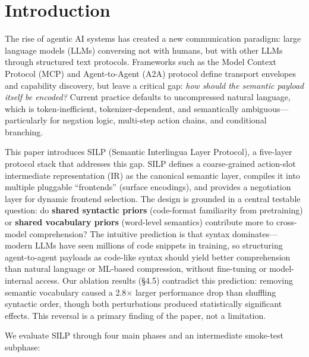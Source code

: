 \documentclass{article}
\begin{document}
\section{Introduction}\label{introduction}



The rise of agentic AI systems has created a new communication paradigm: large language models (LLMs) conversing not with humans, but with other LLMs through structured text protocols. Frameworks such as the Model Context Protocol (MCP) and Agent-to-Agent (A2A) protocol define transport envelopes and capability discovery, but leave a critical gap: \emph{how should the semantic payload itself be encoded?} Current practice defaults to uncompressed natural language, which is token-inefficient, tokenizer-dependent, and semantically ambiguous---particularly for negation logic, multi-step action chains, and conditional branching.



This paper introduces SILP (Semantic Interlingua Layer Protocol), a five-layer protocol stack that addresses this gap. SILP defines a coarse-grained action-slot intermediate representation (IR) as the canonical semantic layer, compiles it into multiple pluggable ``frontends'' (surface encodings), and provides a negotiation layer for dynamic frontend selection. The design is grounded in a central testable question: do \textbf{shared syntactic priors} (code-format familiarity from pretraining) or \textbf{shared vocabulary priors} (word-level semantics) contribute more to cross-model comprehension? The intuitive prediction is that syntax dominates---modern LLMs have seen millions of code snippets in training, so structuring agent-to-agent payloads as code-like syntax should yield better comprehension than natural language or ML-based compression, without fine-tuning or model-internal access. Our ablation results (\S4.5) contradict this prediction: removing semantic vocabulary caused a 2.8$\times$ larger performance drop than shuffling syntactic order, though both perturbations produced statistically significant effects. This reversal is a primary finding of the paper, not a limitation.



We evaluate SILP through four main phases and an intermediate smoke-test subphase:
\end{document}
